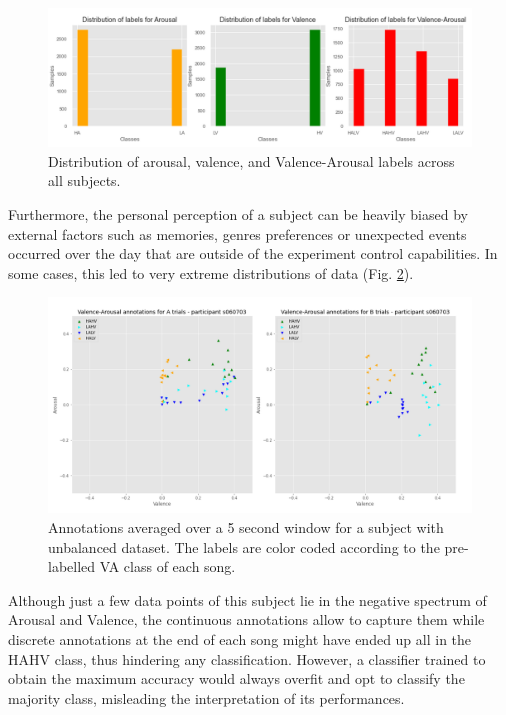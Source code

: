 \begin{figure}[h!]
\includegraphics[width=12cm]{img/methods/labels_distribution.png}
\centering
\caption{Distribution of arousal, valence, and Valence-Arousal labels across all subjects.} \label{fig_labels_distribution}
\end{figure}

Furthermore, the personal perception of a subject can be heavily biased by external factors such as memories, genres preferences or unexpected events occurred over the day that are outside of the experiment control capabilities. In some cases, this led to very extreme distributions of data (Fig. \ref{fig_unbalanced_example}).

\begin{figure}[h!]
\includegraphics[width=12cm]{img/methods/unbalanced_example.png}
\centering
\caption{Annotations averaged over a 5 second window for a subject with unbalanced dataset. The labels are color coded according to the pre-labelled VA class of each song.} \label{fig_unbalanced_example}
\end{figure}

Although just a few data points of this subject lie in the negative spectrum of Arousal and Valence, the continuous annotations allow to capture them while discrete annotations at the end of each song might have ended up all in the HAHV class, thus hindering any classification. However, a classifier trained to obtain the maximum accuracy would always overfit and opt to classify the majority class, misleading the interpretation of its performances. 

